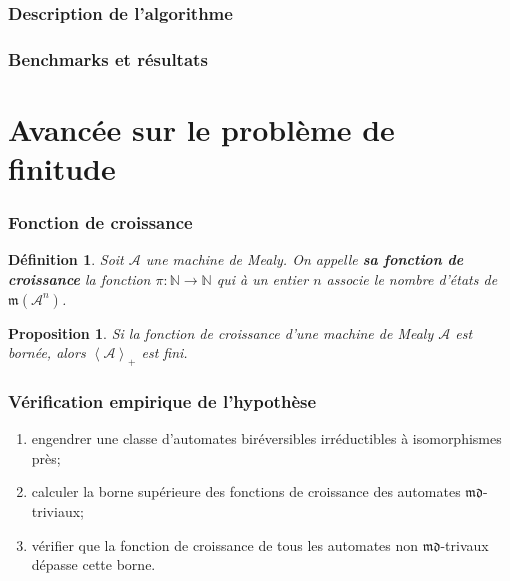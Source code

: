 \documentclass[11pt]{beamer}
\newtheorem{prop}{Proposition}
\newtheorem{defi}{Définition}
\begin{document}
	\begin{frame}
		\frametitle{Description de l'algorithme}
	\end{frame}

	\begin{frame}
		\frametitle{Benchmarks et résultats}
	\end{frame}

	\section{Avancée sur le problème de finitude}
	
	\begin{frame}
		\frametitle{Fonction de croissance}
		
		\begin{defi} %
			Soit $\mathcal{A}$ une machine de Mealy. On appelle \textbf{\textit{sa fonction de croissance}} la fonction $\pi:\mathbb{N}\rightarrow\mathbb{N}$ qui à un entier $n$ associe le nombre d'états de~$\mathfrak{m}\left(\mathcal{A}^n\right)$.
		\end{defi}
		
		\begin{prop} %
			Si la fonction de croissance d'une machine de Mealy $\mathcal{A}$ est bornée, alors $\left<\mathcal{A}\right>_+$ est fini.
		\end{prop}
	\end{frame}

	\begin{frame}
		\frametitle{Vérification empirique de l'hypothèse}
		
		\begin{enumerate}
			\item engendrer une classe d'automates biréversibles irréductibles à isomorphismes près;
			\item calculer la borne supérieure des fonctions de croissance des automates $\mathfrak{md}$-triviaux;
			\item vérifier que la fonction de croissance de tous les automates non $\mathfrak{md}$-trivaux dépasse cette borne.
		\end{enumerate}
	\end{frame}
\end{document}
